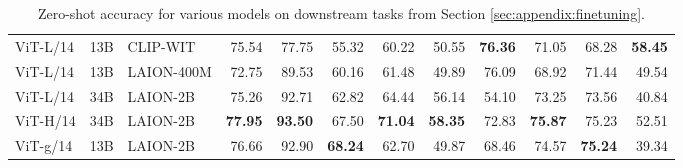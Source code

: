 \begin{appendix}
\begin{table}
\begin{tabular}{lrlrrrrrrrrr}
ViT-L/14 &          13B &    CLIP-WIT &         75.54 &     77.75 &    55.32 &        60.22 &      50.55 &      \textbf{76.36} &         71.05 &       68.28 &     \textbf{58.45} \\                                  
ViT-L/14 &          13B &  LAION-400M &         72.75 &     89.53 &    60.16 &        61.48 &      49.89 &      76.09 &         68.92 &       71.44 &     49.54 \\                                  
ViT-L/14 &          34B &    LAION-2B &         75.26 &     92.71 &    62.82 &        64.44 &      56.14 &      54.10 &         73.25 &       73.56 &     40.84 \\      ViT-H/14 &          34B &    LAION-2B &         \textbf{77.95} &     \textbf{93.50} &    67.50 &        \textbf{71.04} &      \textbf{58.35} &      72.83 &         \textbf{75.87} &       75.23 &     52.51 \\                           
ViT-g/14 &          13B &    LAION-2B &         76.66 &     92.90 &    \textbf{68.24} &        62.70 &      49.87 &      68.46 &         74.57 &       \textbf{75.24} &     39.34 \\                                 
\bottomrule
\end{tabular}
\caption{
    Zero-shot accuracy for various models on downstream tasks from Section \ref{sec:appendix:finetuning}.
    \label{tab:appendix:joint_ft_zs}
    }
\end{table}




\begin{table}
\scriptsize
\centering
\setlength\tabcolsep{5pt}
\begin{tabular}{lrlrrrrrrrr}     
\toprule                           


\end{tabular}
\end{table}
\end{appendix}
